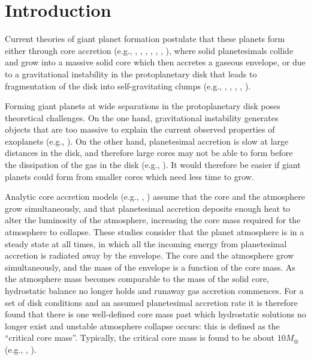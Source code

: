 \documentclass[apj]{emulateapj}
\begin{document}
\section{Introduction}
\label{intro}

Current theories of giant planet formation postulate that these planets form either through core accretion (e.g., \citealt{harris78}, \citealt{mizuno78}, \citealt{stevenson82}, \citealt{boden86}, \citealt{wuchterl93}, \citealt{pollack96}, \citealt{dangelo11}), where solid planetesimals collide and grow into a massive solid core which then accretes a gaseous envelope, or due to a gravitational instability in the protoplanetary disk that leads to fragmentation of the disk into self-gravitating clumps (e.g., \citealt{harris78}, \citealt{boss97}, \citealt{rafikov05}, \citealt{kratter10}, \citealt{dangelo11}).  %


Forming giant planets at wide separations in the protoplanetary disk poses theoretical challenges. On the one hand, gravitational instability generates objects that are too massive to explain the current observed properties of exoplanets (e.g., \citealt{rafikov05}). On the other hand, planetesimal accretion is slow at large distances in the disk, and therefore large cores may not be able to form before the dissipation of the gas in the disk (e.g., \citealt{rafikov06}). It would therefore be easier if giant planets could form from smaller cores which need less time to grow. 


Analytic core accretion models (e.g., \citealt{stevenson82}, \citealt{rafikov06}) assume that the core and the atmosphere grow simultaneously, and that planetesimal accretion deposits enough heat to alter the luminosity of the atmosphere, increasing the core mass required for the atmosphere to collapse. These studies consider that the planet atmosphere is in a steady state at all times, in which all the incoming energy from planetesimal accretion is radiated away by the envelope. The core and the atmosphere grow simultaneously, and the mass of the envelope is a function of the core mass. As the atmosphere mass becomes comparable to the mass of the solid core, hydrostatic balance no longer holds and runaway gas accretion commences. For a set of disk conditions and an assumed planetesimal accretion rate it is therefore found that there is one well-defined core mass past which hydrostatic solutions no longer exist and unstable atmosphere collapse occurs: this is defined as the ``critical core mass''.  Typically, the critical core mass is found to be about $10 M_{\oplus}$ (e.g., \citealt{stevenson82}, \citealt{rafikov06}). 
\end{document}
